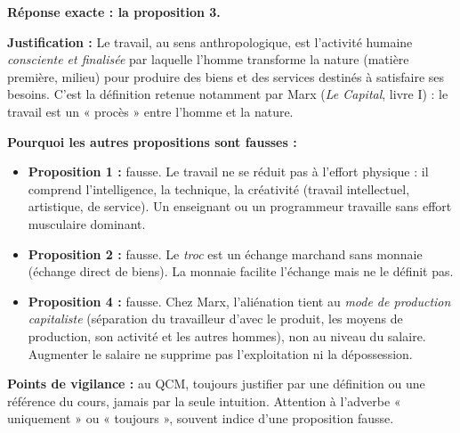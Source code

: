 \documentclass[11pt]{article}
\begin{document}
\begin{corrige}
\textbf{Réponse exacte : la proposition 3.}

\textbf{Justification :} Le travail, au sens anthropologique, est l'activité humaine \emph{consciente et finalisée} par laquelle l'homme transforme la nature (matière première, milieu) pour produire des biens et des services destinés à satisfaire ses besoins. C'est la définition retenue notamment par Marx (\emph{Le Capital}, livre I) : le travail est un « procès » entre l'homme et la nature.

\textbf{Pourquoi les autres propositions sont fausses :}
\begin{itemize}
    \item \textbf{Proposition 1 :} fausse. Le travail ne se réduit pas à l'effort physique : il comprend l'intelligence, la technique, la créativité (travail intellectuel, artistique, de service). Un enseignant ou un programmeur travaille sans effort musculaire dominant.
    \item \textbf{Proposition 2 :} fausse. Le \emph{troc} est un échange marchand sans monnaie (échange direct de biens). La monnaie facilite l'échange mais ne le définit pas.
    \item \textbf{Proposition 4 :} fausse. Chez Marx, l'aliénation tient au \emph{mode de production capitaliste} (séparation du travailleur d'avec le produit, les moyens de production, son activité et les autres hommes), non au niveau du salaire. Augmenter le salaire ne supprime pas l'exploitation ni la dépossession.
\end{itemize}

\textbf{Points de vigilance :} au QCM, toujours justifier par une définition ou une référence du cours, jamais par la seule intuition. Attention à l'adverbe « uniquement » ou « toujours », souvent indice d'une proposition fausse.
\end{corrige}
\end{document}

